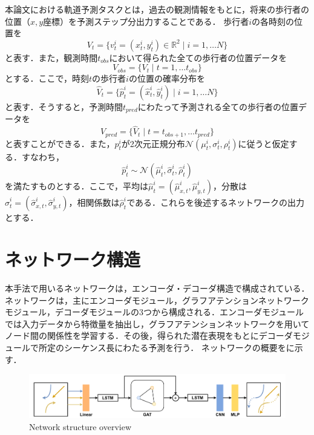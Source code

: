 本論文における軌道予測タスクとは，過去の観測情報をもとに，将来の歩行者の位置（$x,y$座標）を予測ステップ分出力することである．
歩行者$i$の各時刻の位置を
\begin{equation}
  V_t = \{ v^i_t = (x^i_t, y^i_t) \in \mathbb{R}^2 \mid i = 1, \dots N \}
\end{equation}
と表す．また，観測時間$t_{obs}$において得られた全ての歩行者の位置データを
\begin{equation}
  V_{obs} = \{ V_t \mid t = 1, \dots t_{obs} \}  
\end{equation}
とする．ここで，時刻$t$の歩行者$i$の位置の確率分布を
\begin{equation}
  \hat{V}_t = \{ \hat{p}^i_t = (\hat{x}^i_t, \hat{y}^i_t) \mid i = 1, \dots N \} \label{hat-pos}
\end{equation}
と表す．そうすると，予測時間$t_{pred}$にわたって予測される全ての歩行者の位置データを
\begin{equation}
  V_{pred} = \{ \hat{V}_t \mid t = t_{obs + 1}, \dots t_{pred} \}
\end{equation}
と表すことができる．また，$p^i_t$が2次元正規分布$\mathcal{N}(\mu^i_t, \sigma^i_t, \rho^i_t)$に従うと仮定する．すなわち，
\begin{equation}
  \hat{p}^i_t \sim \mathcal{N}(\hat{\mu}^i_t, \hat{\sigma}^i_t, \hat{\rho}^i_t)
\end{equation}
を満たすものとする．ここで，平均は$\hat{\mu}^i_t = (\hat{\mu}^i_{x, t}, \hat{\mu}^i_{y, t})$，分散は$\hat{\sigma}^i_t = (\hat{\sigma}^i_{x, t}, \hat{\sigma}^i_{y, t})$，相関係数は$\hat{\rho}^i_t$である．これらを後述するネットワークの出力とする．

\section{ネットワーク構造}
本手法で用いるネットワークは，エンコーダ・デコーダ構造で構成されている．ネットワークは，主にエンコーダモジュール，グラフアテンションネットワークモジュール，デコーダモジュールの3つから構成される．エンコーダモジュールでは入力データから特徴量を抽出し，グラフアテンションネットワークを用いてノード間の関係性を学習する．その後，得られた潜在表現をもとにデコーダモジュールで所定のシーケンス長にわたる予測を行う．
ネットワークの概要をに示す．

\begin{figure}[H]
  \centering
 \includegraphics[keepaspectratio, scale=0.36]
      {images/network-comp.pdf}
\caption{Network structure overview}
 \label{Fig:network}
\end{figure}   

